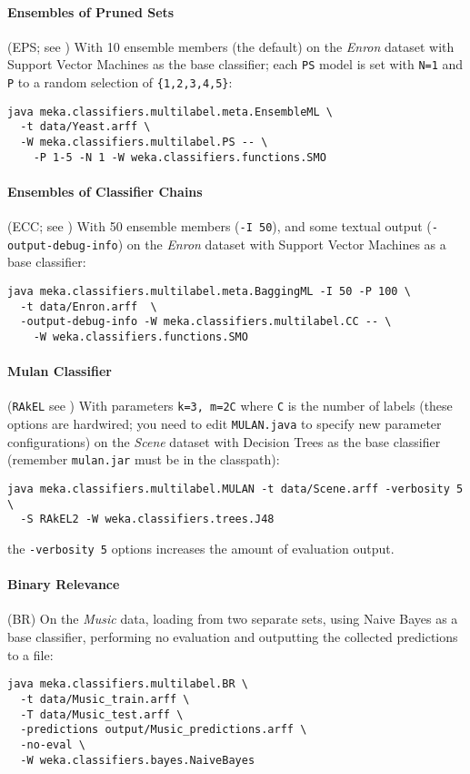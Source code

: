 \documentclass[11pt]{article}
\begin{document}
\paragraph{Ensembles of Pruned Sets} (EPS; see \cite{EPS}) With 10 ensemble members (the default) on the \textit{Enron} dataset with Support Vector Machines as the base classifier; each \texttt{PS} model is set with \texttt{N=1} and \texttt{P} to a random selection of \texttt{\{1,2,3,4,5\}}:

\begin{lstlisting}
java meka.classifiers.multilabel.meta.EnsembleML \
  -t data/Yeast.arff \
  -W meka.classifiers.multilabel.PS -- \
    -P 1-5 -N 1 -W weka.classifiers.functions.SMO
\end{lstlisting}

\paragraph{Ensembles of Classifier Chains} (ECC; see \cite{ECC2}) With 50 ensemble members (\texttt{-I 50}), and some textual output (\texttt{-output-debug-info}) on the \textit{Enron} dataset with Support Vector Machines as a base classifier:
\begin{lstlisting}
java meka.classifiers.multilabel.meta.BaggingML -I 50 -P 100 \
  -t data/Enron.arff  \
  -output-debug-info -W meka.classifiers.multilabel.CC -- \ 
    -W weka.classifiers.functions.SMO
\end{lstlisting}

\paragraph{Mulan Classifier} (\texttt{RAkEL} see \cite{RAKEL}) With parameters \texttt{\texttt{k=3}, \texttt{m=2C}} where \texttt{C} is the number of labels (these options are hardwired; you need to edit \texttt{MULAN.java} to specify new parameter configurations) on the \textit{Scene} dataset with Decision Trees as the base classifier (remember {\texttt{mulan.jar} must be in the classpath}):
\begin{lstlisting}
java meka.classifiers.multilabel.MULAN -t data/Scene.arff -verbosity 5 \ 
  -S RAkEL2 -W weka.classifiers.trees.J48
\end{lstlisting}
the \texttt{-verbosity 5} options increases the amount of evaluation output.

\paragraph{Binary Relevance} (BR) On the \textit{Music} data, loading from two separate sets, using Naive Bayes as a base classifier, performing no evaluation and outputting the collected predictions to a file:
\begin{lstlisting}
java meka.classifiers.multilabel.BR \
  -t data/Music_train.arff \
  -T data/Music_test.arff \
  -predictions output/Music_predictions.arff \
  -no-eval \
  -W weka.classifiers.bayes.NaiveBayes
\end{lstlisting}
\end{document}
